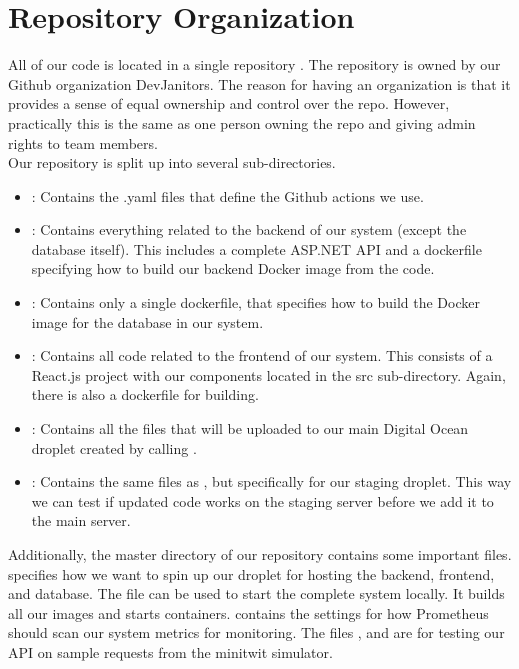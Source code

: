\section{Repository Organization}
All of our code is located in a single repository . The repository is owned by our Github organization DevJanitors. The reason for having an organization is that it provides a sense of equal ownership and control over the repo. However, practically this is the same as one person owning the repo and giving admin rights to team members.\\

Our repository is split up into several sub-directories.

\begin{itemize}
    \item {}: Contains the .yaml files that define the Github actions we use.
    \item {}: Contains everything related to the backend of our system (except the database itself). This includes a complete ASP.NET API and a dockerfile specifying how to build our backend Docker image from the code.
    \item {}: Contains only a single dockerfile, that specifies how to build the Docker image for the database in our system.
    \item {}: Contains all code related to the frontend of our system. This consists of a React.js project with our components located in the src sub-directory. Again, there is also a dockerfile for building.
    \item {}: Contains all the files that will be uploaded to our main Digital Ocean droplet created by calling .
    \item {}: Contains the same files as , but specifically for our staging droplet. This way we can test if updated code works on the staging server before we add it to the main server.
\end{itemize}

Additionally, the master directory of our repository contains some important files.  specifies how we want to spin up our droplet for hosting the backend, frontend, and database. The file  can be used to start the complete system locally. It builds all our images and starts containers.  contains the settings for how Prometheus should scan our system metrics for monitoring. The files , and  are for testing our API on sample requests from the minitwit simulator.\\

